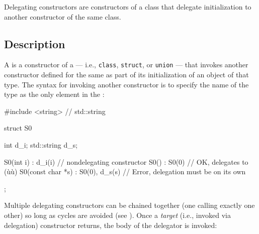 


\setcounter{table}{0}
\setcounter{footnote}{0}
\setcounter{lstlisting}{0}

Delegating constructors are constructors of a class that delegate initialization to another
constructor of the same class.

\subsection[Description]{Description}\label{description}

A  is a constructor of a
 --- i.e., \lstinline!class!, \lstinline!struct!, or
\lstinline!union! --- that invokes another constructor defined for the same
 as part of its initialization of an object of that type.
The syntax for invoking another constructor is to specify
the name of the type as the only element in the :

%
\begin{emcppslisting}
#include <string>  // std::string

struct S0
{
  int         d_i;
  std::string d_s;

  S0(int i)         : d_i(i)        {} // nondelegating constructor
  S0()              : S0(0)         {} // OK, delegates to (ù{}ù)
  S0(const char *s) : S0(0), d_s(s) {} // Error, delegation must be on its own
};
\end{emcppslisting}

\noindent Multiple delegating constructors can be chained together (one calling
exactly one other) so long as cycles are avoided (see ).
Once a \emph{target} (i.e., invoked via delegation) constructor returns,
the body of the delegator is invoked:

